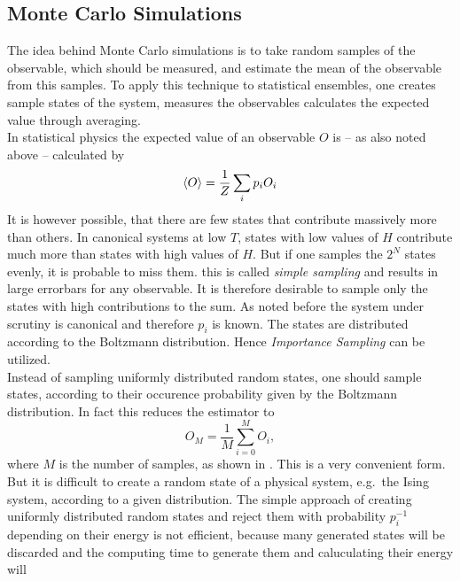 \subsection{Monte Carlo Simulations}
\label{ssec:montecarlo}
    The idea behind Monte Carlo simulations is to take random samples of
    the observable, which should be measured, and estimate the mean of
    the observable from this samples. To apply this technique to statistical
    ensembles, one creates sample states of the system, measures the
    observables calculates the expected value through averaging.\\
    In statistical physics the expected value of an observable \(O\)
    is -- as also noted above -- calculated by
    \begin{equation}
        \left< O \right> = \frac{1}{Z} \sum_i p_i O_i
    \end{equation}
    It is however possible, that there are few states that contribute
    massively more than others. In canonical systems at low \(T\),
    states with low values of \(H\) contribute much more than states with
    high values of \(H\).
    But if one samples the \(2^N\) states evenly, it is probable to miss
    them. this is called \emph{simple sampling} and results in large
    errorbars for any observable.
    It is therefore desirable to sample only the states with high
    contributions to the sum.
    As noted before the system under scrutiny is canonical and therefore
    \(p_i\) is known. The states are distributed according to the Boltzmann
    distribution. Hence \emph{Importance Sampling} can be utilized.\\
    Instead of sampling uniformly distributed random states, one should sample
    states, according to their occurence probability given by the Boltzmann
    distribution. In fact this reduces the estimator to
    \begin{equation}
        O_M = \frac{1}{M} \sum_{i=0}^M O_i,
    \end{equation}
    where \(M\) is the number of samples, as shown in \cite{NewmanBarkema1999}.
    This is a very convenient form.\\
    But it is difficult to create a random state of a physical system,
    e.g.\ the Ising system, according to a given distribution. The simple
    approach of creating uniformly distributed random states and reject
    them with probability \(p_i^{-1}\) depending on their energy is not
    efficient, because many generated states will be discarded and the
    computing time to generate them and caluculating their energy will
